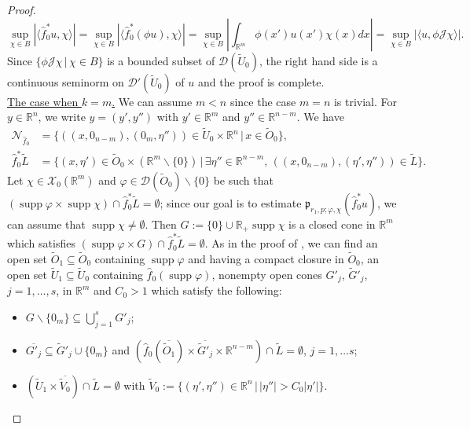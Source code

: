 \documentclass[12pt,reqno]{amsart}
\newcommand{\RR}{\mathbb R}
\newcommand{\DD}{\mathcal D}
\newcommand{\XX}{\mathcal X}
\newcommand{\supp}{\operatorname{supp}}
\theoremstyle{plain}
\theoremstyle{remark}
\theoremstyle{definition}
\numberwithin{equation}{section}
\begin{document}
\begin{proof}
\begin{equation*}
\sup_{\chi\in B}|\langle\hat{f}^*_0u,\chi\rangle|=\sup_{\chi\in B}|\langle\hat{f}^*_0(\phi u),\chi\rangle|=\sup_{\chi\in B}\left|\int_{\RR^m}\phi(x') u(x') \chi(x) dx\right|=\sup_{\chi\in B}|\langle u,\phi\mathcal{J}\chi\rangle|.
\end{equation*}
Since $\{\phi\mathcal{J}\chi\,|\, \chi \in B\}$ is a bounded subset of $\DD(\widetilde{U}_0)$, the right hand side is a continuous seminorm on $\DD'(\widetilde{U}_0)$ of $u$ and the proof is complete.\\
\indent \underline{The case when $k=m$.} We can assume $m<n$ since the case $m=n$ is trivial. For $y\in\RR^n$, we write $y=(y',y'')$ with $y'\in\RR^m$ and $y''\in\RR^{n-m}$. We have
\begin{align}
\mathcal{N}_{\hat{f}_0}&=\{((x,0_{n-m}),(0_m,\eta''))\in \widetilde{U}_0\times\RR^n\,|\, x\in\widetilde{O}_0\},\label{nor-for-map-injec111111}\\
\hat{f}_0^*\widetilde{L}&=\{(x,\eta')\in \widetilde{O}_0\times(\RR^m\backslash \{0\})\,|\, \exists\eta''\in\RR^{n-m},\, ((x,0_{n-m}),(\eta',\eta''))\in\widetilde{L}\}.\nonumber
\end{align}
Let $\chi\in\XX_0(\RR^m)$ and $\varphi\in\DD(\widetilde{O}_0)\backslash\{0\}$ be such that $(\supp\varphi\times\supp\chi)\cap \hat{f}_0^*\widetilde{L}=\emptyset$; since our goal is to estimate $\mathfrak{p}_{r_1,p;\varphi,\chi}(\hat{f}^*_0u)$, we can assume that $\supp\chi\neq\emptyset$. Then $G:=\{0\}\cup\RR_+\supp\chi$ is a closed cone in $\RR^m$ which satisfies $(\supp\varphi\times G)\cap \hat{f}_0^*\widetilde{L}=\emptyset$. As in the proof of \cite[Theorem 3.21, CASE 3]{PP}, we can find an open set $\widetilde{O}_1\subseteq \widetilde{O}_0$ containing $\supp\varphi$ and having a compact closure in $\widetilde{O}_0$, an open set $\widetilde{U}_1\subseteq \widetilde{U}_0$ containing $\hat{f}_0(\supp\varphi)$, nonempty open cones $G'_j$, $\widetilde{G}'_j$, $j=1,\ldots,s$, in $\RR^m$ and $C_0>1$ which satisfy the following:
\begin{itemize}
\item[$(i)'$] $G\backslash\{0_m\}\subseteq \bigcup_{j=1}^sG'_j$;
\item[$(ii)'$] $\overline{G'_j}\subseteq \widetilde{G}'_j\cup\{0_m\}$ and $(\hat{f}_0(\overline{\widetilde{O}_1})\times \overline{\widetilde{G}'_j}\times\RR^{n-m})\cap \widetilde{L}=\emptyset$, $j=1,\ldots s$;
\item[$(iii)'$] $(\widetilde{U}_1\times \overline{\widetilde{V}_0})\cap \widetilde{L}=\emptyset$ with $\widetilde{V}_0:=\{(\eta',\eta'')\in\RR^n\,|\, |\eta''|>C_0|\eta'|\}$.

\end{itemize}
\end{proof}
\end{document}
